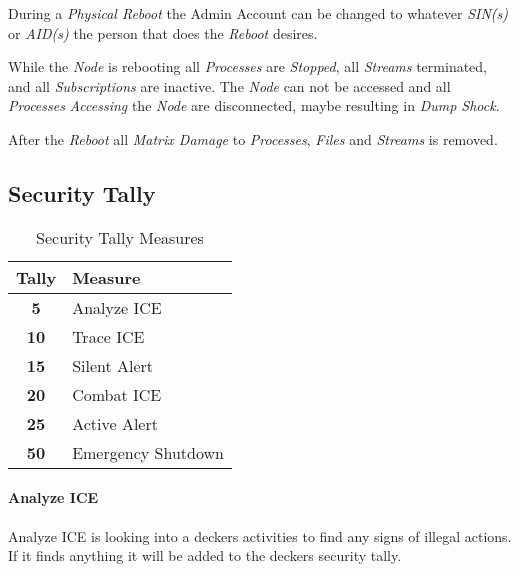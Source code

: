 During a \emph{Physical Reboot} the Admin Account can be changed to whatever
\emph{SIN(s)} or \emph{AID(s)} the person that does the \emph{Reboot} desires.

While the \emph{Node} is rebooting all \emph{Processes} are \emph{Stopped}, all
\emph{Streams} terminated, and all \emph{Subscriptions} are inactive. The
\emph{Node} can not be accessed and all \emph{Processes} \emph{Accessing} the
\emph{Node} are disconnected, maybe resulting in \emph{Dump Shock}.


After the \emph{Reboot} all \emph{Matrix Damage} to \emph{Processes}, \emph{Files}
and \emph{Streams} is removed.



\subsection{Security Tally}

\begin{table}[htb]
    \caption[Security Tally Measures]{Security Tally Measures}
    \label{tab:tally measures}
    \centering
    \begin{tabular}{cl}
        \toprule
        \textbf{Tally} & \textbf{Measure}   \\
        \midrule
        \textbf{5}     & Analyze ICE        \\
        \textbf{10}    & Trace ICE          \\
        \textbf{15}    & Silent Alert       \\
        \textbf{20}    & Combat ICE         \\
        \textbf{25}    & Active Alert       \\
        \textbf{50}    & Emergency Shutdown \\
        \bottomrule
    \end{tabular}
\end{table}


\paragraph{Analyze ICE}

Analyze ICE is looking into a deckers activities to find any signs of illegal
actions. If it finds anything it will be added to the deckers security tally.

